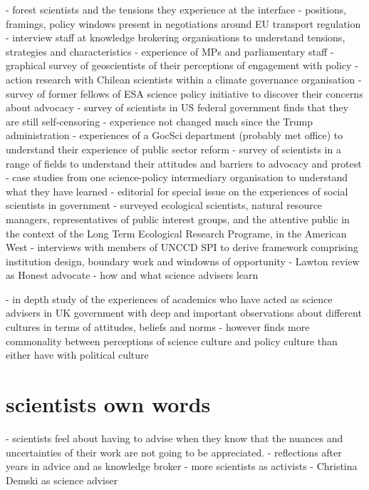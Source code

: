 \cite{OjanenBKP2021} - forest scientists and the tensions they experience at the interface
\cite{vonMalmborg2024transport} - positions, framings, policy windows present in negotiations around EU transport regulation
\cite{MacKillopCDD2023} - interview staff at knowledge brokering organisations to understand tensions, strategies and characteristics
\cite{KennyRHTB2017} - experience of MPs and parliamentary staff
\cite{KalafatisL2019} - graphical survey of geoscientists of their perceptions of engagement with policy
\cite{IbarraJOBCIMRS2022} - action research with Chilean scientists within a climate governance organisation
\cite{ElsensohnACDGGKPRS2019} - survey of former fellows of ESA science policy initiative to discover their concerns about advocacy
\cite{DesikanC2023} - survey of scientists in US federal government finds that they are still self-censoring - experience not changed much since the Trump administration
\cite{DanfordDR2009} - experiences of a GocSci department (probably met office) to understand their experience of public sector reform
\cite{DablanderSCSBGGBAH2024} - survey of scientists in a range of fields to understand their attitudes and barriers to advocacy and protest
\cite{BednarekSHG2015} - case studies from one science-policy intermediary organisation to understand what they have learned
\cite{SaxonbergSL2023} - editorial for special issue on the experiences of social scientists in government
\cite{SteelLLS2004} - surveyed ecological scientists, natural resource managers, representatives of public interest groups, and the attentive public in the context of the Long Term Ecological Research Programe, in the American West
\cite{VelanderD2024} - interviews with members of UNCCD SPI to derive framework comprising institution design, boundary work and windowns of opportunity
\cite{RoseBOP2018} - Lawton review as Honest advocate
\cite{Obermeister2020} - how and what science advisers learn

\cite{Obermeister2022} - in depth study of the experiences of academics who have acted as science advisers in UK government with deep and important observations about different cultures in terms of attitudes, beliefs and norms - however finds more commonality between perceptions of science culture and policy culture than either have with political culture

\section{scientists own words}
\cite{Hicks2024} - scientists feel about having to advise when they know that the nuances and uncertainties of their work are not going to be appreciated.
\cite{Gluckman2014} - reflections after years in advice and as knowledge broker
\cite{WyattGT2024} - more scientists as activists
\cite{ThompsonD2024} - Christina Demski as science adviser

